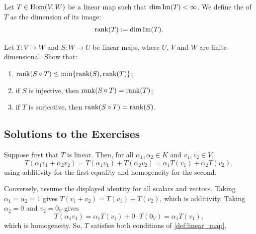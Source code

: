 \begin{definition}
\label{def:rank_linear_map}
Let $T \in \operatorname{Hom}(V, W)$ be a linear map such that $\dim \operatorname{Im}(T) < \infty$. We define the  of $T$ as the dimension of its image:
\[
\operatorname{rank}(T) := \dim \operatorname{Im}(T).
\]
\end{definition}

\begin{exercise}
\label{exc:rank_of_composition}
Let $T: V \to W$ and $S: W \to U$ be linear maps, where $U$, $V$ and $W$ are finite-di\-men\-sional. Show that:
\begin{enumerate}[label=\textbf{(\alph*)}]
    \item $\operatorname{rank}(S \circ T) \le \min\{\operatorname{rank}(S), \operatorname{rank}(T)\}$;
    \item if $S$ is injective, then $\operatorname{rank}(S \circ T) = \operatorname{rank}(T)$;
    \item if $T$ is surjective, then $\operatorname{rank}(S \circ T) = \operatorname{rank}(S)$.
\end{enumerate}
\end{exercise}

\subsection{Solutions to the Exercises}

\begin{exercisesolution}
\label{sol:linearity_criterion}
Suppose first that $T$ is linear. Then, for all $\alpha_1, \alpha_2 \in K$ and $v_1, v_2 \in V$,
\[
T(\alpha_1 v_1 + \alpha_2 v_2) = T(\alpha_1 v_1) + T(\alpha_2 v_2) = \alpha_1 T(v_1) + \alpha_2 T(v_2),
\]
using additivity for the first equality and homogeneity for the second.

Conversely, assume the displayed identity for all scalars and vectors. Taking $\alpha_1 = \alpha_2 = 1$ gives $T(v_1 + v_2) = T(v_1) + T(v_2)$, which is additivity. Taking $\alpha_2 = 0$ and $v_2 = 0_V$ gives
\[
T(\alpha_1 v_1) = \alpha_1 T(v_1) + 0 \cdot T(0_V) = \alpha_1 T(v_1),
\]
which is homogeneity. So, $T$ satisfies both conditions of \cref{def:linear_map}.
\end{exercisesolution}

